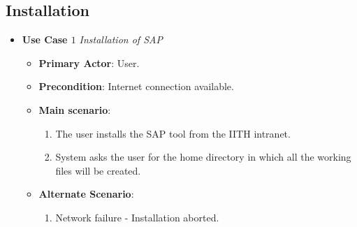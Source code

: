 \documentclass{report}
\begin{document}
\subsection{Installation}
\begin{tcolorbox}[colframe=white, colback=lightblue, arc=8pt]
\begin{itemize}
    \item \textbf{Use Case $1$} \textit{Installation of SAP}\\
    \begin{itemize}
        \item \textbf{Primary Actor}: User.
        \item \textbf{Precondition}: Internet connection available.
        \item \textbf{Main scenario}: \begin{enumerate}
            \item The user installs the SAP tool from the IITH intranet. 
            \item System asks the user for the home directory in which all the working files will be created.
        \end{enumerate}
       \item \textbf{Alternate Scenario}: 
       \begin{enumerate}
           \item Network failure - Installation aborted.
       \end{enumerate}
    \end{itemize}
\end{itemize}
\end{tcolorbox}
\end{document}
